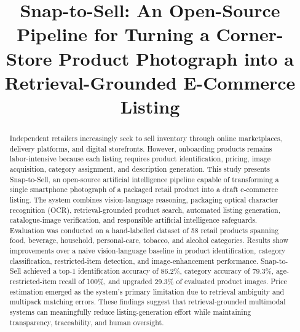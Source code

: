 \documentclass[conference]{IEEEtran}
\begin{document}
\title{
Snap-to-Sell:
An Open-Source Pipeline for Turning a Corner-Store Product Photograph into a Retrieval-Grounded E-Commerce Listing
}

\author{%
\and
{}
\and
{}
\and
{}
}

\maketitle

\begin{abstract}

Independent retailers increasingly seek to sell inventory through online marketplaces, delivery platforms, and digital storefronts. However, onboarding products remains labor-intensive because each listing requires product identification, pricing, image acquisition, category assignment, and description generation. This study presents Snap-to-Sell, an open-source artificial intelligence pipeline capable of transforming a single smartphone photograph of a packaged retail product into a draft e-commerce listing. The system combines vision-language reasoning, packaging optical character recognition (OCR), retrieval-grounded product search, automated listing generation, catalogue-image verification, and responsible artificial intelligence safeguards. Evaluation was conducted on a hand-labelled dataset of 58 retail products spanning food, beverage, household, personal-care, tobacco, and alcohol categories. Results show improvements over a naive vision-language baseline in product identification, category classification, restricted-item detection, and image-enhancement performance. Snap-to-Sell achieved a top-1 identification accuracy of 86.2\%, category accuracy of 79.3\%, age-restricted-item recall of 100\%, and upgraded 29.3\% of evaluated product images. Price estimation emerged as the system's primary limitation due to retrieval ambiguity and multipack matching errors. These findings suggest that retrieval-grounded multimodal systems can meaningfully reduce listing-generation effort while maintaining transparency, traceability, and human oversight. 

\end{abstract}
\end{document}
